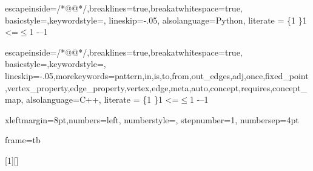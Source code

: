\usepackage{microtype}
\renewcommand*\ttdefault{txtt}

\usepackage{listings}

\usepackage{textcomp}
\lstset{upquote=true}



{%
escapeinside={/*@}{@*/},breaklines=true,breakatwhitespace=true,%
basicstyle=\color{lightblue},keywordstyle=,%
lineskip=-.05\baselineskip,%
alsolanguage=Python,
literate = %
  {\{}{\smaller{$\{$}}{1}%
  {\}}{\smaller{$\}$}}{1}%
  {<=}{$\leq$}{1}%
  {-}{--}{1}%
}

{%
escapeinside={/*@}{@*/},breaklines=true,breakatwhitespace=true,%
basicstyle=\color{lightblue},keywordstyle=,%
lineskip=-.05\baselineskip,morekeywords={pattern,in,is,to,from,out_edges,adj,once,fixed_point,vertex_property,edge_property,vertex,edge,meta,auto,concept,requires,concept_map},%
alsolanguage=C++,
literate = %
  {\{}{\smaller{$\{$}}{1}%
  {\}}{\smaller{$\}$}}{1}%
  {<=}{$\leq$}{1}%
  {-}{--}{1}%
}

{xleftmargin=8pt,numbers=left, numberstyle=\tiny,%
stepnumber=1, numbersep=4pt}

{frame=tb}


[1][\small]{}{}
